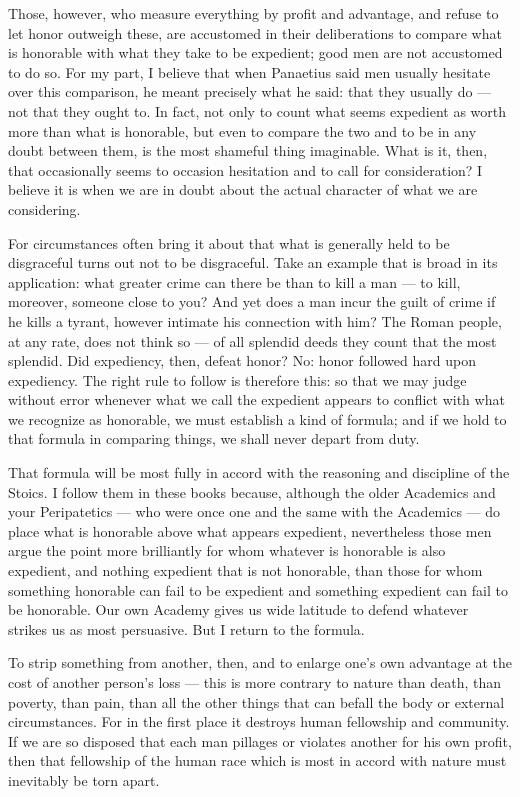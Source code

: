  Those, however, who measure everything by profit and advantage, and refuse to let honor outweigh these, are accustomed in their deliberations to compare what is honorable with what they take to be expedient; good men are not accustomed to do so. For my part, I believe that when Panaetius said men usually hesitate over this comparison, he meant precisely what he said: that they usually do — not that they ought to. In fact, not only to count what seems expedient as worth more than what is honorable, but even to compare the two and to be in any doubt between them, is the most shameful thing imaginable. What is it, then, that occasionally seems to occasion hesitation and to call for consideration? I believe it is when we are in doubt about the actual character of what we are considering.

 For circumstances often bring it about that what is generally held to be disgraceful turns out not to be disgraceful. Take an example that is broad in its application: what greater crime can there be than to kill a man — to kill, moreover, someone close to you? And yet does a man incur the guilt of crime if he kills a tyrant, however intimate his connection with him? The Roman people, at any rate, does not think so — of all splendid deeds they count that the most splendid. Did expediency, then, defeat honor? No: honor followed hard upon expediency. The right rule to follow is therefore this: so that we may judge without error whenever what we call the expedient appears to conflict with what we recognize as honorable, we must establish a kind of formula; and if we hold to that formula in comparing things, we shall never depart from duty.

 That formula will be most fully in accord with the reasoning and discipline of the Stoics. I follow them in these books because, although the older Academics and your Peripatetics — who were once one and the same with the Academics — do place what is honorable above what appears expedient, nevertheless those men argue the point more brilliantly for whom whatever is honorable is also expedient, and nothing expedient that is not honorable, than those for whom something honorable can fail to be expedient and something expedient can fail to be honorable. Our own Academy gives us wide latitude to defend whatever strikes us as most persuasive. But I return to the formula.

 To strip something from another, then, and to enlarge one's own advantage at the cost of another person's loss — this is more contrary to nature than death, than poverty, than pain, than all the other things that can befall the body or external circumstances. For in the first place it destroys human fellowship and community. If we are so disposed that each man pillages or violates another for his own profit, then that fellowship of the human race which is most in accord with nature must inevitably be torn apart.


